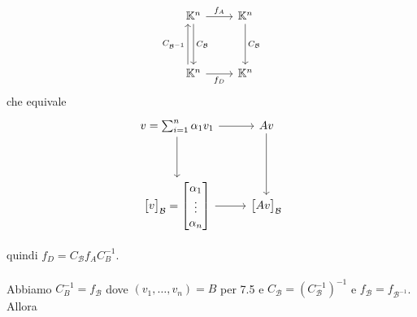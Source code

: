 \documentclass[12pt]{article}
\begin{document}
\begin{equation*}
\begin{tikzcd}[row sep= huge]
\mathbb{K}^n \arrow[r, "f_A"] \arrow[d, "C_{\mathcal{B}}"] & \mathbb{K}^n  \arrow[d, "C_{\mathcal{B}}"] \\
\mathbb{K}^n \arrow[r, swap, "f_D"] \arrow[u, xshift=-5, "C_{\mathcal{B}^{-1}}"]& \mathbb{K}^n
\end{tikzcd}
\end{equation*}
che equivale
\begin{equation*}
\begin{tikzcd}[row sep= huge]
v = \sum^n_{i=1}\alpha_1v_1 \arrow[r] \arrow[d] & Av \arrow[d,] \\
\begin{bmatrix}
    v
\end{bmatrix}_{\mathcal{B}} = \begin{bmatrix}
    \alpha_1\\
    \vdots\\
    \alpha_n
\end{bmatrix} \arrow[r, swap] & \begin{bmatrix}
    Av
\end{bmatrix}_{\mathcal{B}}
\end{tikzcd}
\end{equation*}

quindi $f_D = C_{\mathcal{B}}f_AC_{B}^{-1}$.\\\\
Abbiamo $C_{B}^{-1} = f_{\mathcal{B}}$ dove $(v_1, \dots, v_n) = B$ per 7.5 e $C_{\mathcal{B}} = (C_{\mathcal{B}}^{-1})^{-1}$ e $f_{\mathcal{B}} = f_{\mathcal{B}^{-1}}$.
Allora
\end{document}
